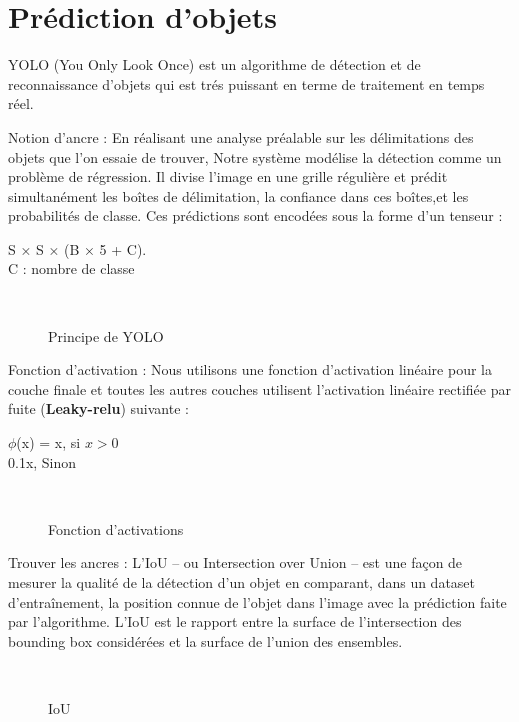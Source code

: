 {\section{Prédiction d'objets}
YOLO (You Only Look Once) est un algorithme de détection et de reconnaissance d'objets qui est trés puissant en terme de traitement en temps réel.

Notion d’ancre : En réalisant une analyse préalable sur les délimitations des objets que l’on essaie de trouver, Notre système modélise la détection comme un problème de régression. Il divise l'image en une grille régulière et prédit simultanément les boîtes de délimitation, la confiance dans ces boîtes,et les probabilités de classe. Ces prédictions sont encodées sous la forme d'un tenseur : 
\begin{center}
    S × S × (B × 5 + C).\\
    C : nombre de classe
\end{center}



\begin{figure}[H] 
\centering
{}\\[0.5cm]
\caption{Principe de YOLO}
\label{fig:figure18}
\end{figure}


Fonction d’activation : Nous utilisons une fonction d'activation linéaire pour la couche finale et toutes les autres couches utilisent l'activation linéaire rectifiée par fuite (\textbf{Leaky-relu}) suivante :\\
\begin{center}
    $\phi$(x) = x, si $x > 0$ \\
    0.1x, Sinon
\end{center}
 

\begin{figure}[H] 
\centering
{}\\[0.5cm]
\caption{Fonction d'activations}
\label{fig:figure18}
\end{figure}


Trouver les ancres : L’IoU – ou Intersection over Union – est une façon de mesurer la qualité de la détection d’un objet en comparant, dans un dataset d’entraînement, la position connue de l’objet dans l’image avec la prédiction faite par l’algorithme. L’IoU est le rapport entre la surface de l’intersection des bounding box considérées et la surface de l’union des ensembles.
\begin{figure}[H] 
\centering
{}\\[0.5cm]
\caption{IoU}
\label{fig:figure18}
\end{figure}


}
